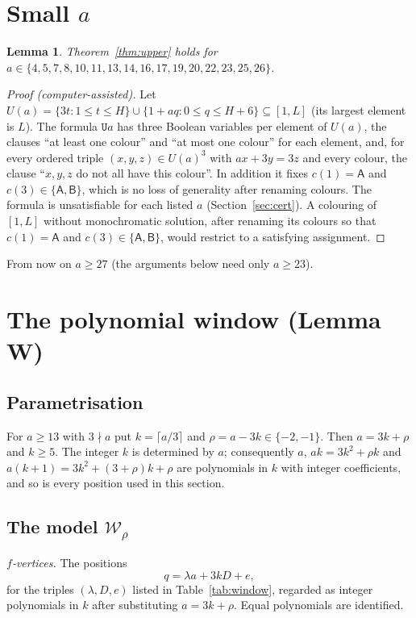 \documentclass[11pt]{amsart}
\newtheorem{lemma}[theorem]{Lemma}
\theoremstyle{definition}
\theoremstyle{remark}
\newcommand{\cA}{\mathsf{A}}\newcommand{\cB}{\mathsf{B}}\newcommand{\cC}{\mathsf{C}}
\begin{document}
\section{Small $a$}\label{sec:small}

\begin{lemma}\label{lem:small}
Theorem~\ref{thm:upper} holds for $a\in\{4,5,7,8,10,11,13,14,16,17,19,20,22,23,25,26\}$.
\end{lemma}
\begin{proof}[Proof (computer-assisted)]
Let $U(a)=\{3t:1\le t\le H\}\cup\{1+aq:0\le q\le H+6\}\subseteq[1,L]$ (its largest element is $L$). The formula
$\mathtt{U}a$ has three Boolean variables per element of $U(a)$, the clauses ``at least one colour'' and ``at most
one colour'' for each element, and, for every ordered triple $(x,y,z)\in U(a)^3$ with $ax+3y=3z$ and every colour,
the clause ``$x,y,z$ do not all have this colour''. In addition it fixes $c(1)=\cA$ and $c(3)\in\{\cA,\cB\}$, which
is no loss of generality after renaming colours. The formula is unsatisfiable for each listed $a$
(Section~\ref{sec:cert}). A colouring of $[1,L]$ without monochromatic solution, after renaming its colours so that
$c(1)=\cA$ and $c(3)\in\{\cA,\cB\}$, would restrict to a satisfying assignment.
\end{proof}

From now on $a\ge27$ (the arguments below need only $a\ge23$).

\section{The polynomial window (Lemma W)}\label{sec:W}

\subsection{Parametrisation}
For $a\ge13$ with $3\nmid a$ put $k=\lceil a/3\rceil$ and $\rho=a-3k\in\{-2,-1\}$. Then $a=3k+\rho$ and $k\ge5$. The
integer $k$ is determined by $a$; consequently $a$, $ak=3k^2+\rho k$ and $a(k+1)=3k^2+(3+\rho)k+\rho$ are polynomials
in $k$ with integer coefficients, and so is every position used in this section.

\subsection{The model $\mathcal W_\rho$}
\emph{$f$-vertices.} The positions
\[q=\lambda a+3kD+e,\]
for the triples $(\lambda,D,e)$ listed in Table~\ref{tab:window}, regarded as integer polynomials in $k$ after
substituting $a=3k+\rho$. Equal polynomials are identified.
\end{document}
